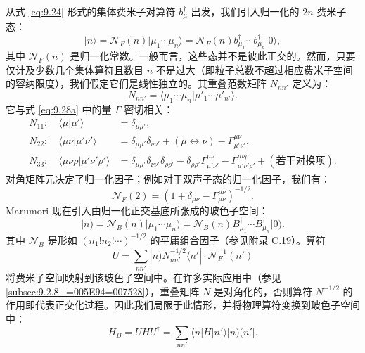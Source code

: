 从式 \ref{eq:9.24} 形式的集体费米子对算符 $b^{\dagger}_{\mu}$ 出发，我们引入归一化的 $2n$-费米子态：
\begin{equation}
|n\rangle=\mathscr{N}_{F}(n)|\mu_{1}\cdots\mu_{n}\rangle=\mathscr{N}_{F}(n)b^{\dagger}_{\mu_{1}}\cdots b^{\dagger}_{\mu_{n}}|0\rangle,\label{eq:9.53}
\end{equation}
其中 $\mathscr{N}_{F}(n)$ 是归一化常数。一般而言，这些态并不是彼此正交的。然而，只要仅计及少数几个集体算符且数目
$n$ 不是过大（即粒子总数不超过相应费米子空间的容纳限度），我们假定它们是线性独立的。其重叠范数矩阵 $N_{nn'}$ 定义为：
\begin{equation}
N_{nn'}=\langle\mu_{1}\cdots\mu_{n}|\mu'_{1}\cdots\mu'_{n'}\rangle.\label{eq:9.54}
\end{equation}
它与式 \ref{eq:9.28a} 中的量 $\Gamma$ 密切相关：
\begin{align}
N_{11}:\quad\langle\mu|\mu'\rangle & =\delta_{\mu\mu'},\nonumber \\
N_{22}:\quad\langle\mu\nu|\mu'\nu'\rangle & =\delta_{\mu\mu'}\delta_{\nu\nu'}+(\mu\leftrightarrow\nu)-\Gamma^{\mu\nu}_{\mu'\nu'},\label{eq:9.55}\\
N_{33}:\quad\langle\mu\nu\rho|\mu'\nu'\rho'\rangle & =\delta_{\mu\mu'}\delta_{\nu\nu'}\delta_{\rho\rho'}-\delta_{\rho\rho'}\Gamma^{\mu\nu}_{\mu'\nu'}-\Gamma^{\mu\nu\rho}_{\mu'\nu'\rho'}+(\text{若干对换项}).\nonumber 
\end{align}
对角矩阵元决定了归一化因子；例如对于双声子态的归一化因子，我们有：
\begin{equation}
\mathscr{N}_{F}(2)=\left(1+\delta_{\mu\nu}-\Gamma^{\mu\nu}_{\mu\nu}\right)^{-1/2}.\label{eq:9.56}
\end{equation}
Marumori 现在引入由归一化正交基底所张成的玻色子空间：
\begin{equation}
|n)=\mathscr{N}_{B}(n)|\mu_{1}\cdots\mu_{n})=\mathscr{N}_{B}(n)B^{\dagger}_{\mu_{1}}\cdots B^{\dagger}_{\mu_{n}}|0).\label{eq:9.57}
\end{equation}
其中 $\mathscr{N}_{B}$ 是形如 $(n_{1}!n_{2}!\cdots)^{-1/2}$ 的平庸组合因子（参见附录
C.19）。算符
\begin{equation}
U=\sum_{nn'}|n)N^{-1/2}_{nn'}\langle n'|\cdot\mathscr{N}^{-1}_{F}(n')\label{eq:9.58}
\end{equation}
将费米子空间映射到该玻色子空间中。在许多实际应用中（参见 \ref{subsec:9.2.8_=005E94=007528}），重叠矩阵
$N$ 是对角化的，否则算符 $N^{-1/2}$ 的作用即代表正交化过程。因此我们局限于此情形，并将物理算符变换到玻色子空间中：
\begin{equation}
H_{B}=UHU^{\dagger}=\sum_{nn'}\langle n|H|n'\rangle|n)(n'|.\label{eq:9.59}
\end{equation}
